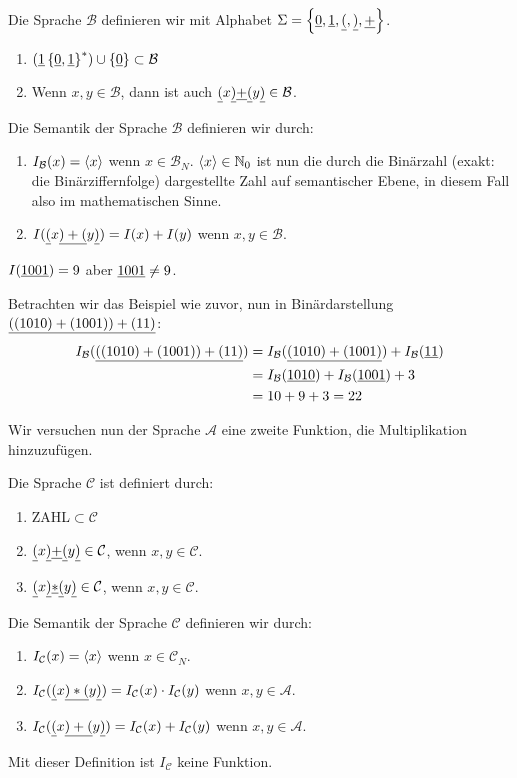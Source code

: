 \begin{defn}
Die Sprache $\mathcal{B}$ definieren wir mit Alphabet $\Sigma=\left\{\underline{0},\underline{1},\underline{(},\underline{)},\underline{+}\right\}$.
\begin{enumerate}
\item $(\underline{1} \left\{\underline{0},\underline{1}\right\}^*) \cup \left\{\underline{0}\right\} \subset \mathcal{B}$
\item Wenn $x,y \in \mathcal{B}$, dann ist auch $\underline{(} x \underline{)} \underline{+} \underline{(} y \underline{)} \in \mathcal{B}$.
\end{enumerate}
Die Semantik der Sprache $\mathcal{B}$ definieren wir durch:
\begin{enumerate}
\item $I_{\mathcal{B}}(x) = \left<x\right>$ wenn $x \in \mathcal{B}_N$. $\left<x\right> \in \mathbb{N}_0$ ist nun die
durch die Binärzahl (exakt: die Binärziffernfolge) dargestellte Zahl auf semantischer Ebene, in diesem Fall also im mathematischen Sinne.
\item $I(\underline{(}x\underline{)+(}y\underline{)})=I(x) + I(y)$ wenn $x,y \in \mathcal{B}$.
\end{enumerate}
\end{defn}
\begin{bsp}
$I(\underline{1001})=9$ aber $\underline{1001}\neq 9$.

Betrachten wir das Beispiel wie zuvor, nun in Binärdarstellung $\underline{((1010)+(1001))+(11)}$: 
\begin{align*}
I_{\mathcal{B}}(\underline{((1010)+(1001))+(11)}) &= I_{\mathcal{B}}(\underline{(1010)+(1001)}) + I_{\mathcal{B}}(\underline{11})\\
                      &= I_{\mathcal{B}}(\underline{1010}) + I_{\mathcal{B}}(\underline{1001}) + 3\\
                      &= 10 + 9 + 3 = 22
\end{align*}
\end{bsp}

Wir versuchen nun der Sprache $\mathcal{A}$ eine zweite Funktion, die Multiplikation hinzuzufügen.
\begin{defn}
Die Sprache $\mathcal{C}$ ist definiert durch:
\begin{enumerate}
\item ZAHL$\subset \mathcal{C}$
\item $\underline{(} x \underline{)} \underline{+} \underline{(} y \underline{)} \in \mathcal{C}$, wenn $x,y \in \mathcal{C}$.
\item $\underline{(} x \underline{)} \underline{*} \underline{(} y \underline{)} \in \mathcal{C}$, wenn $x,y \in \mathcal{C}$.
\end{enumerate}
Die Semantik der Sprache $\mathcal{C}$ definieren wir durch:
\begin{enumerate}
\item $I_{\mathcal{C}}(x) = \left<x\right>$ wenn $x \in \mathcal{C}_N$.
\item $I_{\mathcal{C}}(\underline{(}x\underline{)*(}y\underline{)})=I_{\mathcal{C}}(x) \cdot I_{\mathcal{C}}(y)$ wenn $x,y \in \mathcal{A}$.
\item $I_{\mathcal{C}}(\underline{(}x\underline{)+(}y\underline{)})=I_{\mathcal{C}}(x) + I_{\mathcal{C}}(y)$ wenn $x,y \in \mathcal{A}$.
\end{enumerate}
\end{defn}
Mit dieser Definition ist $I_{\mathcal{C}}$ keine Funktion.

